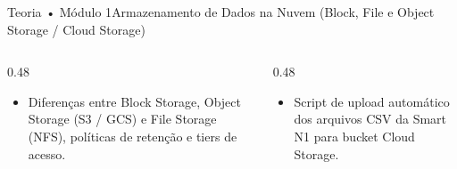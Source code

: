 \begin{senaiframe}{Teoria • Módulo 1}{Armazenamento de Dados na Nuvem (Block, File e Object Storage / Cloud Storage)}
  \begin{columns}[t]
    \begin{column}{0.48\textwidth}
      \begin{tcolorbox}[senaibluecard, title={Fundamentos Teóricos}]
        \begin{itemize}
          \item Diferenças entre Block Storage, Object Storage (S3 / GCS) e File Storage (NFS), políticas de retenção e tiers de acesso.
        \end{itemize}
      \end{tcolorbox}
    \end{column}
    \begin{column}{0.48\textwidth}
      \begin{tcolorbox}[senaigreencard, title={Prática \& Laboratório}]
        \begin{itemize}
          \item Script de upload automático dos arquivos CSV da Smart N1 para bucket Cloud Storage.
        \end{itemize}
      \end{tcolorbox}
    \end{column}
  \end{columns}
\end{senaiframe}
